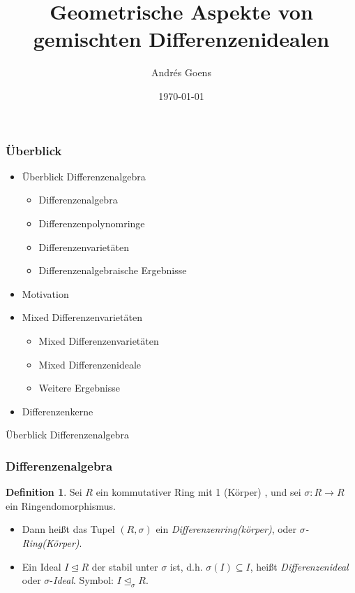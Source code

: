\documentclass{beamer}
\title{Geometrische Aspekte von gemischten Differenzenidealen}
\author{Andr\'{e}s Goens}
\date{\today}
\def\s{\sigma}
\def\si{\unlhd_{\sigma}}
\theoremstyle{definition}
\newtheorem{defn}[satz]{Definition}
\begin{document}
\begin{frame}
\maketitle
\end{frame}

\begin{frame}\frametitle{Überblick}
\begin{itemize}
\item Überblick Differenzenalgebra
\begin{itemize}
\item Differenzenalgebra
\item Differenzenpolynomringe
\item Differenzenvarietäten
\item Differenzenalgebraische Ergebnisse
\end{itemize}
\item Motivation 
\item Mixed Differenzenvarietäten
\begin{itemize}
\item Mixed Differenzenvarietäten
\item Mixed Differenzenideale
\item Weitere Ergebnisse
\end{itemize}
\item Differenzenkerne
\end{itemize}
\end{frame}

\begin{frame}
\begin{center}
\LARGE Überblick Differenzenalgebra
\end{center}
\end{frame}

\begin{frame}\frametitle{Differenzenalgebra}
\begin{defn}
Sei  $R$ ein kommutativer Ring mit 1 (K\"{o}rper) , und sei
 $\sigma: R \rightarrow R$ ein Ringendomorphismus.
\begin{itemize}
\item Dann heißt das Tupel $(R,\sigma)$ ein \emph{Differenzenring(k\"{o}rper)}, oder $\sigma$\emph{-Ring(K\"{o}rper)}.
\item Ein Ideal $I \unlhd R$ der stabil unter $\s$ ist, d.h. $\s(I) \subseteq I$, heißt \emph{Differenzenideal} oder $\s$-\emph{Ideal}. Symbol: $I \si R$.
\end{itemize}
\end{defn}
\end{frame}
\end{document}
